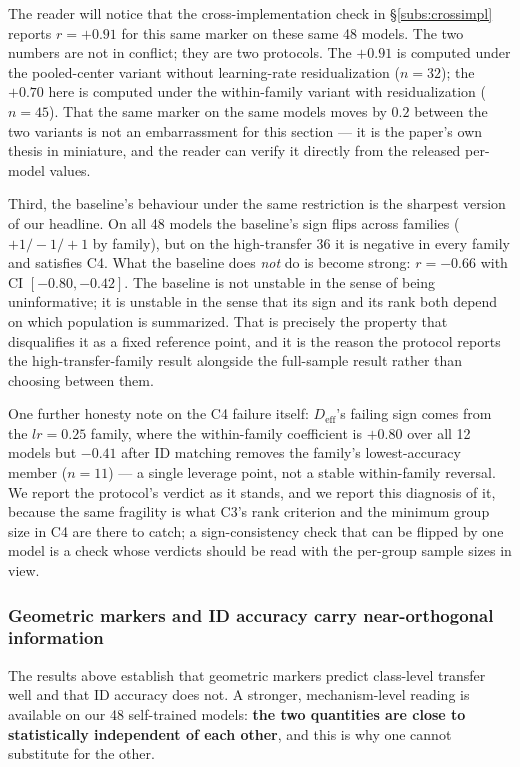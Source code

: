 \documentclass[10pt]{article} %
\newcommand{\srcref}[1]{\S\ref{#1}}
\begin{document}
The reader will notice that the cross-implementation check in \srcref{subs:crossimpl} reports $r=+0.91$ for this same marker on these same 48 models. The two numbers are not in conflict; they are two protocols. The $+0.91$ is computed under the pooled-center variant without learning-rate residualization ($n=32$); the $+0.70$ here is computed under the within-family variant with residualization ($n=45$). That the same marker on the same models moves by $0.2$ between the two variants is not an embarrassment for this section --- it is the paper's own thesis in miniature, and the reader can verify it directly from the released per-model values.

Third, the baseline's behaviour under the same restriction is the sharpest version of our headline. On all 48 models the baseline's sign flips across families ($+1/-1/+1$ by family), but on the high-transfer 36 it is negative in every family and satisfies C4. What the baseline does \emph{not} do is become strong: $r=-0.66$ with CI $[-0.80,-0.42]$. The baseline is not unstable in the sense of being uninformative; it is unstable in the sense that its sign and its rank both depend on which population is summarized. That is precisely the property that disqualifies it as a fixed reference point, and it is the reason the protocol reports the high-transfer-family result alongside the full-sample result rather than choosing between them.

One further honesty note on the C4 failure itself: $D_{\mathrm{eff}}$'s failing sign comes from the $lr=0.25$ family, where the within-family coefficient is $+0.80$ over all 12 models but $-0.41$ after ID matching removes the family's lowest-accuracy member ($n=11$) --- a single leverage point, not a stable within-family reversal. We report the protocol's verdict as it stands, and we report this diagnosis of it, because the same fragility is what C3's rank criterion and the minimum group size in C4 are there to catch; a sign-consistency check that can be flipped by one model is a check whose verdicts should be read with the per-group sample sizes in view.

\subsubsection{Geometric markers and ID accuracy carry near-orthogonal information}
\label{subs:orthogonal}

The results above establish that geometric markers predict class-level transfer well and that ID accuracy does not. A stronger, mechanism-level reading is available on our 48 self-trained models: \textbf{the two quantities are close to statistically independent of each other}, and this is why one cannot substitute for the other.
\end{document}
